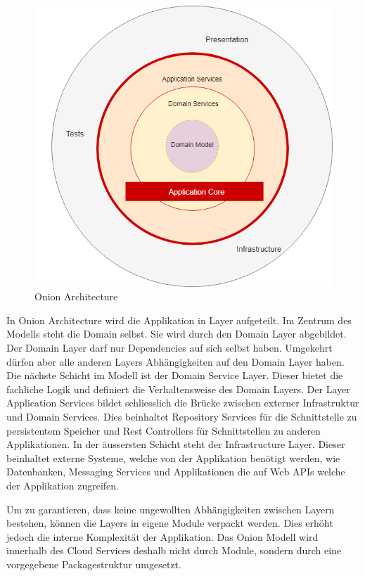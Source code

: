 \begin{figure}[h]
    \centering
    \begin{minipage}[b]{0.5\textwidth}
        \includegraphics[width=\textwidth]{graphics/thinktocode-onion}
        \caption{Onion Architecture}
    \end{minipage}
\end{figure}

In Onion Architecture wird die Applikation in Layer aufgeteilt.\cite{medium-onion}
Im Zentrum des Modells steht die Domain selbst.
Sie wird durch den Domain Layer abgebildet.
Der Domain Layer darf nur Dependencies auf sich selbst haben.
Umgekehrt dürfen aber alle anderen Layers Abhängigkeiten auf den Domain Layer haben.
Die nächste Schicht im Modell ist der Domain Service Layer.
Dieser bietet die fachliche Logik und definiert die Verhaltensweise des Domain Layers.
Der Layer Application Services bildet schliesslich die Brücke zwischen externer Infrastruktur und Domain Services.
Dies beinhaltet Repository Services für die Schnittstelle zu persistentem Speicher und Rest Controllers für Schnittstellen zu anderen Applikationen.
In der äussersten Schicht steht der Infrastructure Layer.
Dieser beinhaltet externe Systeme, welche von der Applikation benötigt werden, wie Datenbanken, Messaging Services und Applikationen die auf Web APIs welche der Applikation zugreifen.

Um zu garantieren, dass keine ungewollten Abhängigkeiten zwischen Layern bestehen, können die Layers in eigene Module verpackt werden.
Dies erhöht jedoch die interne Komplexität der Applikation.
Das Onion Modell wird innerhalb des Cloud Services deshalb nicht durch Module, sondern durch eine vorgegebene Packagestruktur umgesetzt.

